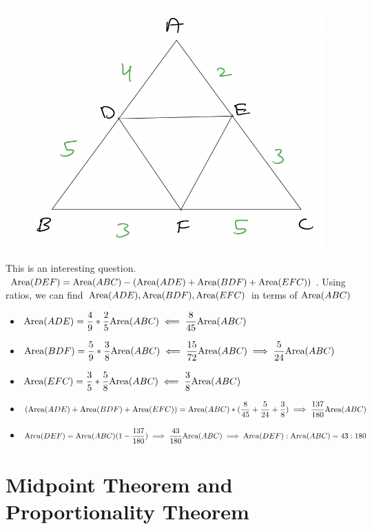 
\begin{figure}[h!]
    \centering
    \includegraphics[width=0.5\linewidth]{Quant//Geometry//Images//Triangles/triangle_11_question_2_area.png}
\end{figure}

This is an interesting question. $\text{Area}({DEF}) = \text{Area}({ABC}) - (\text{Area}({ADE}) + \text{Area}({BDF}) + \text{Area}({EFC}))$. Using ratios, we can find $\text{Area}({ADE}),\text{Area}({BDF}),\text{Area}({EFC})$ in terms of $\text{Area}({ABC})$

\begin{itemize}
    \item $\text{Area}({ADE}) = \dfrac{4}{9} * \dfrac{2}{5} \text{Area}({ABC}) \impliedby \dfrac{8}{45} \text{Area}({ABC})$
    
    \item $\text{Area}({BDF}) = \dfrac{5}{9} * \dfrac{3}{8} \text{Area}({ABC}) \impliedby \dfrac{15}{72} \text{Area}({ABC}) \implies \dfrac{5}{24} \text{Area}({ABC})$
    
    \item $\text{Area}({EFC}) = \dfrac{3}{5} * \dfrac{5}{8} \text{Area}({ABC}) \impliedby \dfrac{3}{8} \text{Area}({ABC})$

    \item $(\text{Area}({ADE}) + \text{Area}({BDF}) + \text{Area}({EFC})) = \text{Area}({ABC}) * (\dfrac{8}{45} + \dfrac{5}{24} + \dfrac{3}{8}) \implies \dfrac{137}{180} \text{Area}({ABC})$

    \item $\text{Area}({DEF}) = \text{Area}({ABC}) ( 1 - \dfrac{137}{180} ) \implies \dfrac{43}{180} \text{Area}({ABC}) \implies \text{Area}({DEF}) : \text{Area}({ABC}) = 43:180$

\end{itemize}

\newpage




\section{Midpoint Theorem and Proportionality Theorem}

